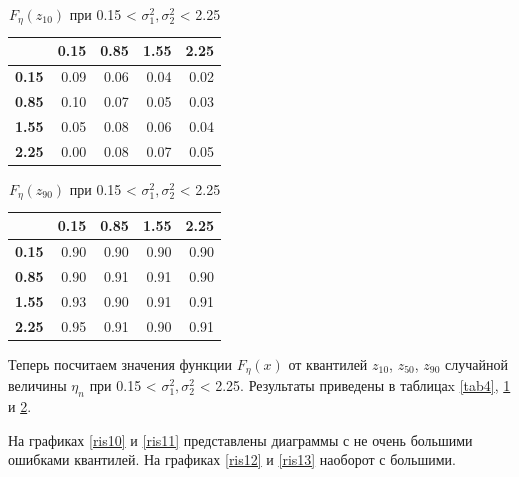 \documentclass[12pt]{article}
\begin{document}
\begin{table}[!hhh]
	\centering
	\caption{$F_{\eta}(z_{10})$ при 0.15 < $\sigma_{1}^{2}, \sigma_{2}^{2}$ < 2.25 }
	\label{tab5}
	\begin{tabular}{rrrrr}
		\hline
		& \textbf{0.15} & \textbf{0.85} & \textbf{1.55} & \textbf{2.25} \\
		\hline
		\textbf{0.15} & 0.09 & 0.06 & 0.04 & 0.02 \\ 
		\textbf{0.85} & 0.10 & 0.07 & 0.05 & 0.03 \\ 
		\textbf{1.55} & 0.05 & 0.08 & 0.06 & 0.04 \\ 
		\textbf{2.25} & 0.00 & 0.08 & 0.07 & 0.05 \\ 
		\hline
	\end{tabular}
\end{table}

\begin{table}[!hhh]
	\centering
	\caption{$F_{\eta}(z_{90})$ при 0.15 < $\sigma_{1}^{2}, \sigma_{2}^{2}$ < 2.25 }
	\label{tab6}
	\begin{tabular}{rrrrr}
		\hline
		& \textbf{0.15} & \textbf{0.85} & \textbf{1.55} & \textbf{2.25} \\
		\hline
		\textbf{0.15} & 0.90 & 0.90 & 0.90 & 0.90 \\ 
		\textbf{0.85} & 0.90 & 0.91 & 0.91 & 0.90 \\ 
		\textbf{1.55} & 0.93 & 0.90 & 0.91 & 0.91 \\ 
		\textbf{2.25} & 0.95 & 0.91 & 0.90 & 0.91 \\ 
		\hline
	\end{tabular}
\end{table}

Теперь посчитаем значения функции $F_{\eta}(x)$ от квантилей $z_{10}$, $z_{50}$, $z_{90}$ случайной величины $\eta_{n}$ при 0.15 < $\sigma_{1}^{2}, \sigma_{2}^{2}$ < 2.25. Результаты приведены в таблицаx \ref{tab4}, \ref{tab5} и \ref{tab6}.

На графиках \ref{ris10} и \ref{ris11} представлены диаграммы с не очень большими ошибками квантилей. На графиках \ref{ris12} и \ref{ris13} наоборот с большими.
\end{document}
